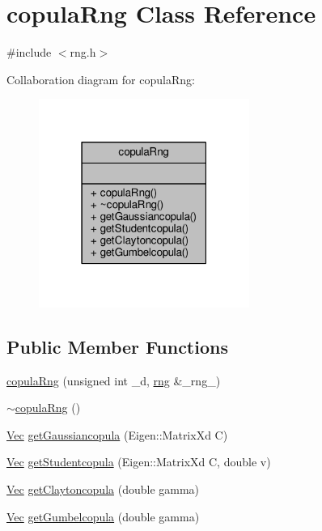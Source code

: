 \hypertarget{classcopulaRng}{}\section{copula\+Rng Class Reference}
\label{classcopulaRng}


{\ttfamily \#include $<$rng.\+h$>$}



Collaboration diagram for copula\+Rng\+:
\nopagebreak
\begin{figure}[H]
\begin{center}
\leavevmode
\includegraphics[width=195pt]{classcopulaRng__coll__graph}
\end{center}
\end{figure}
\subsection*{Public Member Functions}
\begin{DoxyCompactItemize}
\item 
\hyperlink{classcopulaRng_a223e069676a02b38f8bb2cafa242cf54}{copula\+Rng} (unsigned int \+\_\+d, \hyperlink{classrng}{rng} \&\+\_\+rng\+\_\+)
\item 
\hyperlink{classcopulaRng_a2adb46d54717a4c76f9a46245ee3cacc}{$\sim$copula\+Rng} ()
\item 
\hyperlink{compute__returns__eigen_8h_a1eb6a9306ef406d7975f3cbf2e247777}{Vec} \hyperlink{classcopulaRng_a1aac3848b57818708af45d7cb3bdfa9f}{get\+Gaussiancopula} (Eigen\+::\+Matrix\+Xd C)
\item 
\hyperlink{compute__returns__eigen_8h_a1eb6a9306ef406d7975f3cbf2e247777}{Vec} \hyperlink{classcopulaRng_a6d06b353f8c4eec06084919c254a8a40}{get\+Studentcopula} (Eigen\+::\+Matrix\+Xd C, double v)
\item 
\hyperlink{compute__returns__eigen_8h_a1eb6a9306ef406d7975f3cbf2e247777}{Vec} \hyperlink{classcopulaRng_a8da7d9a900602dfbb03fff3a627a8763}{get\+Claytoncopula} (double gamma)
\item 
\hyperlink{compute__returns__eigen_8h_a1eb6a9306ef406d7975f3cbf2e247777}{Vec} \hyperlink{classcopulaRng_a7806378704438e24b852da445f999b08}{get\+Gumbelcopula} (double gamma)
\end{DoxyCompactItemize}


